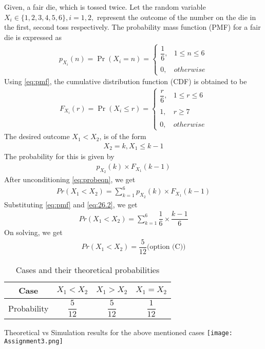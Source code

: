 \documentclass[journal,12pt,twocolumn]{IEEEtran}
\begin{document}
Given, a fair die, which is tossed twice. Let the random variable $X_{i}\in\{1,2,3,4,5,6\},i=1,2,$ represent the outcome of the number on the die in the first, second toss respectively.  
\newline\newline
The probability  mass function (PMF) for a fair die is expressed as \begin{align}
    \tag{26.1}
    \label{eq:pmf}
    p_{X_{i}}(n)=\Pr(X_{i}=n) = 
	\begin{cases}
	\dfrac{1}{6}, & 1\leq n\leq6 \\~\\[-1em]
	0, & otherwise
	\end{cases}
\end{align}
Using \eqref{eq:pmf}, the cumulative distribution function (CDF) is obtained to be
\begin{align}
    \tag{26.2}
    F_{X_{i}}(r)=\Pr(X_{i}\leq r) = 
	\begin{cases}
	\dfrac{r}{6}, & 1\leq r\leq6 \\~\\[-1em]
	1, & r \geq 7 \\~\\[-1em]
	0, & otherwise
	\end{cases}
	\label{eq:26.2}
\end{align}
The desired outcome $X_{1}<X_{2}$, is of the form
\begin{align}
    \tag{26.3}
    X_{2}=k,X_{1}\leq k-1
\end{align}
The probability for this is given by
\begin{align}
    \tag{26.4}
    p_{X_{2}}(k) \times F_{X_{1}}(k-1)
    \label{eq:probeqn}
\end{align}
After unconditioning \eqref{eq:probeqn}, we get
\begin{align}
    \tag{26.5}
    Pr(X_{1}<X_{2})=\sum_{k=1}^{6}p_{X_{2}}(k) \times F_{X_{1}}(k-1)
\end{align}
Substituting \eqref{eq:pmf} and \eqref{eq:26.2}, we get
\begin{align}
    \tag{26.6}
    Pr(X_{1}<X_{2})=\sum_{k=1}^{6}\dfrac{1}{6}\times\dfrac{k-1}{6} 
\end{align}
On solving, we get
\begin{align}
    \tag{26.7}
    Pr(X_{1}<X_{2})=\dfrac{5}{12}\text{(option (C))}
\end{align}
\begin{table}[h!]
\centering
\caption{Cases and their theoretical probabilities}
\label{table:1}
\begin{tabular}{|c||c|c|c|}
    \hline
    Case & $X_{1}<X_{2}$& $X_{1}>X_{2}$& $X_{1}=X_{2}$ \\
    \hline
    Probability & $\dfrac{5}{12}$ & $\dfrac{5}{12}$ & $\dfrac{1}{12}$\\[1ex]
    \hline
\end{tabular}
\end{table}
\newline
Theoretical vs Simulation results for the above mentioned cases
\centering
\texttt{[image: Assignment3.png]}
\end{document}
